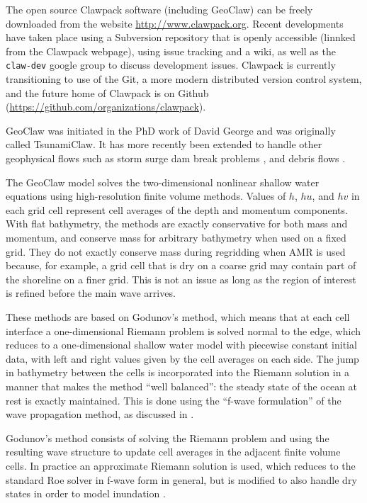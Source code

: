 The open source Clawpack software (including GeoClaw) can be freely
downloaded from the website \url{http://www.clawpack.org}.  
Recent developments have taken
place using a Subversion repository that is openly accessible (linnked from
the Clawpack webpage), using issue tracking and a wiki, as well as the {\tt
claw-dev} google group to discuss development issues.  Clawpack is currently
transitioning to use of the Git, a more modern distributed version control
system, and the future home of Clawpack is on Github
(\url{https://github.com/organizations/clawpack}).

GeoClaw was initiated in the PhD work of David George
\cite{dgeorge:phd,rjl-george:catalina04a,dg-rjl:tsunami06,George2008} and
was originally called TsunamiClaw.  It has more recently been extended to
handle other geophysical flows such as storm surge \cite{mandli:phd}
dam break problems \cite{George:Malpasset}, and debris flows
\cite{GeorgeIverson2011}.

The GeoClaw model solves the two-dimensional nonlinear shallow water equations 
using high-resolution finite volume methods.  Values of $h$, $hu$, and $hv$
in each grid cell represent cell averages of the depth and momentum
components.  With flat bathymetry, the methods are exactly conservative for
both mass and momentum, and conserve mass for arbitrary bathymetry when used
on a fixed grid. They do not exactly conserve mass during regridding when
AMR is used because, for example, a grid cell that is dry on a coarse grid
may contain part of the shoreline on a finer grid.  This is not an issue as
long as the region of interest is refined before the main wave arrives.


These methods are based on Godunov's method, which means that at each cell
interface a one-dimensional Riemann problem is solved normal to the edge,
which reduces to a one-dimensional shallow water model with piecewise
constant initial data,
with left and right values given by the cell averages on each side.
The jump in bathymetry between the cells is incorporated into the Riemann
solution in a manner that makes the method ``well balanced'': the steady
state of the ocean at rest is exactly maintained.  This is done using the
``f-wave formulation'' of the wave propagation method, as discussed in
\cite{BaleLeVequeEtAl2002,George2008,rjl:fvmhp,rjl:wbfwave10}.


Godunov's method consists of solving the Riemann problem and using the
resulting wave structure to update cell averages in the adjacent finite
volume cells.  In practice an approximate Riemann solution is used, which
reduces to the standard Roe solver \cite{rjl:fvmhp,roe:rs}
in f-wave form in general, but is modified
to also handle dry states in order to model inundation \cite{George2008}.

